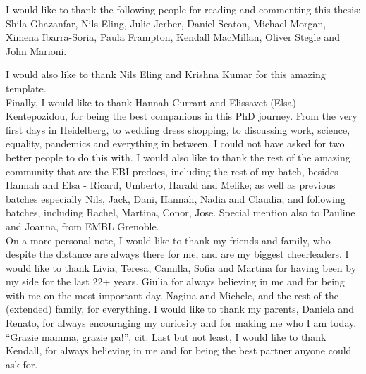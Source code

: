 \begin{acknowledgements}
I would like to thank the following people for reading and commenting this thesis: 
Shila Ghazanfar, 
Nils Eling,
Julie Jerber,
Daniel Seaton,
Michael Morgan,
Ximena Ibarra-Soria,
Paula Frampton,
Kendall MacMillan,
Oliver Stegle and
John Marioni.

I would also like to thank Nils Eling and Krishna Kumar for this amazing template. \\


Finally, I would like to thank Hannah Currant and Elissavet (Elsa) Kentepozidou, for being the best companions in this PhD journey.
From the very first days in Heidelberg, to wedding dress shopping, to discussing work, science, equality, pandemics and everything in between, I could not have asked for two better people to do this with.
I would also like to thank the rest of the amazing community that are the EBI predocs, including the rest of my batch, besides Hannah and Elsa - Ricard, Umberto, Harald and Melike; as well as previous batches especially Nils, Jack, Dani, Hannah, Nadia and Claudia; and following batches, including Rachel, Martina, Conor, Jose. 
Special mention also to Pauline and Joanna, from EMBL Grenoble. \\


On a more personal note, I would like to thank my friends and family, who despite the distance are always there for me, and are my biggest cheerleaders.
I would like to thank Livia, Teresa, Camilla, Sofia and Martina for having been by my side for the last 22+ years.
Giulia for always believing in me and for being with me on the most important day.
Nagiua and Michele, and the rest of the (extended) family, for everything.
I would like to thank my parents, Daniela and Renato, for always encouraging my curiosity and for making me who I am today.
“Grazie mamma, grazie pa!”, cit.
Last but not least, I would like to thank Kendall, for always believing in me and for being the best partner anyone could ask for.

\end{acknowledgements}
